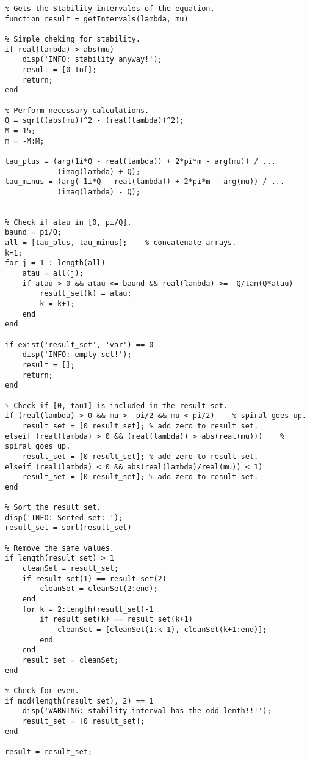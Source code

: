 \begin{verbatim}
% Gets the Stability intervales of the equation.
function result = getIntervals(lambda, mu)

% Simple cheking for stability.
if real(lambda) > abs(mu)
    disp('INFO: stability anyway!');
    result = [0 Inf];
    return;
end

% Perform necessary calculations.
Q = sqrt((abs(mu))^2 - (real(lambda))^2);
M = 15;
m = -M:M;

tau_plus = (arg(1i*Q - real(lambda)) + 2*pi*m - arg(mu)) / ...
            (imag(lambda) + Q);
tau_minus = (arg(-1i*Q - real(lambda)) + 2*pi*m - arg(mu)) / ...
            (imag(lambda) - Q);


% Check if atau in [0, pi/Q].
baund = pi/Q;
all = [tau_plus, tau_minus];    % concatenate arrays.
k=1;
for j = 1 : length(all) 
    atau = all(j); 
    if atau > 0 && atau <= baund && real(lambda) >= -Q/tan(Q*atau)
        result_set(k) = atau;
        k = k+1;
    end
end

if exist('result_set', 'var') == 0
    disp('INFO: empty set!');
    result = [];
    return;
end

% Check if [0, tau1] is included in the result set.
if (real(lambda) > 0 && mu > -pi/2 && mu < pi/2)    % spiral goes up.
    result_set = [0 result_set]; % add zero to result set.
elseif (real(lambda) > 0 && (real(lambda)) > abs(real(mu)))    % spiral goes up.
    result_set = [0 result_set]; % add zero to result set.
elseif (real(lambda) < 0 && abs(real(lambda)/real(mu)) < 1)
    result_set = [0 result_set]; % add zero to result set.        
end

% Sort the result set.
disp('INFO: Sorted set: ');
result_set = sort(result_set)

% Remove the same values.
if length(result_set) > 1
    cleanSet = result_set;
    if result_set(1) == result_set(2)
        cleanSet = cleanSet(2:end);
    end
    for k = 2:length(result_set)-1
        if result_set(k) == result_set(k+1)
            cleanSet = [cleanSet(1:k-1), cleanSet(k+1:end)];
        end
    end
    result_set = cleanSet;
end

% Check for even.
if mod(length(result_set), 2) == 1
    disp('WARNING: stability interval has the odd lenth!!!');
    result_set = [0 result_set];
end

result = result_set;
\end{verbatim}